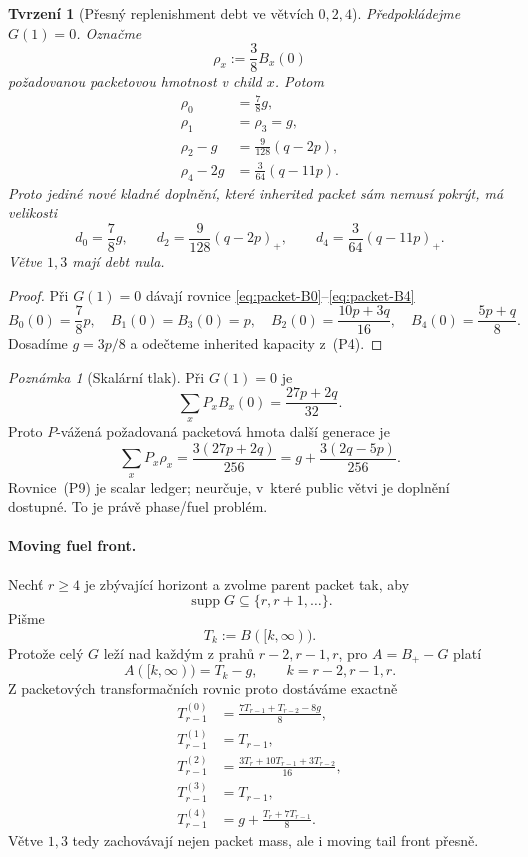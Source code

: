\documentclass[11pt,a4paper]{article}
\newtheorem{proposition}[theorem]{Tvrzení}
\theoremstyle{definition}
\theoremstyle{remark}
\newtheorem{remark}[theorem]{Poznámka}
\newcommand{\supp}{\operatorname{supp}}
\begin{document}
\begin{proposition}[P\v resn\'y replenishment debt ve v\v etv\'ich \(0,2,4\)]
\label{prop:packet-debt}
P\v redpokl\'adejme \(G(1)=0\). Ozna\v cme
\[
\rho_x:=\frac38 B_x(0)
\]
po\v zadovanou packetovou hmotnost v child \(x\). Potom
\begin{align}
\rho_0&=\frac78g,\nonumber\\
\rho_1&=\rho_3=g,\nonumber\\
\rho_2-g&=\frac9{128}(q-2p),\nonumber\\
\rho_4-2g&=\frac3{64}(q-11p).
\tag{P7}
\end{align}
Proto jedin\'e nov\'e kladn\'e dopln\v en\'i, kter\'e inherited packet
s\'am nemus\'i pokr\'yt, m\'a velikosti
\[
\boxed{
d_0=\frac78g,\qquad
d_2=\frac9{128}(q-2p)_+,\qquad
d_4=\frac3{64}(q-11p)_+.
}
\tag{P8}
\]
V\v etve \(1,3\) maj\'i debt nula.
\end{proposition}

\begin{proof}
P\v ri \(G(1)=0\) d\'avaj\'i rovnice
\eqref{eq:packet-B0}--\eqref{eq:packet-B4}
\[
B_0(0)=\frac78p,\quad
B_1(0)=B_3(0)=p,\quad
B_2(0)=\frac{10p+3q}{16},\quad
B_4(0)=\frac{5p+q}{8}.
\]
Dosad\'ime \(g=3p/8\) a ode\v cteme inherited kapacity z~\textup{(P4)}.
\end{proof}

\begin{remark}[Skal\'arn\'i tlak]
P\v ri \(G(1)=0\) je
\[
\sum_xP_xB_x(0)=\frac{27p+2q}{32}.
\]
Proto \(P\)-v\'a\v zen\'a po\v zadovan\'a packetov\'a hmota dal\v s\'i
generace je
\[
\sum_xP_x\rho_x
=\frac{3(27p+2q)}{256}
=g+\frac{3(2q-5p)}{256}.
\tag{P9}
\]
Rovnice~\textup{(P9)} je scalar ledger; neur\v cuje, v~kter\'e public
v\v etvi je dopln\v en\'i dostupn\'e. To je pr\'av\v e phase/fuel probl\'em.
\end{remark}

\paragraph{Moving fuel front.}
Nech\v t \(r\ge4\) je zb\'yvaj\'ic\'i horizont a zvolme parent packet
tak, aby
\[
\supp G\subseteq\{r,r+1,\ldots\}.
\tag{P10}
\]
Pi\v sme
\[
T_k:=B([k,\infty)).
\]
Proto\v ze cel\'y \(G\) le\v z\'i nad ka\v zd\'ym z prah\r u
\(r-2,r-1,r\), pro \(A=B_+-G\) plat\'i
\[
A([k,\infty))=T_k-g,\qquad k=r-2,r-1,r.
\tag{P11}
\]
Z packetov\'ych transforma\v cn\'ich rovnic proto dost\'av\'ame exactn\v e
\begin{align}
T^{(0)}_{r-1}
&=\frac{7T_{r-1}+T_{r-2}-8g}{8},\nonumber\\
T^{(1)}_{r-1}
&=T_{r-1},\nonumber\\
T^{(2)}_{r-1}
&=\frac{3T_r+10T_{r-1}+3T_{r-2}}{16},\nonumber\\
T^{(3)}_{r-1}
&=T_{r-1},\nonumber\\
T^{(4)}_{r-1}
&=g+\frac{T_r+7T_{r-1}}8.
\tag{P12}
\end{align}
V\v etve \(1,3\) tedy zachov\'avaj\'i nejen packet mass, ale i moving
tail front p\v resn\v e.
\end{document}
